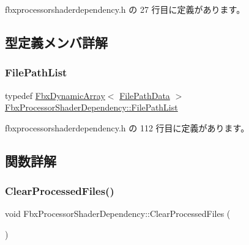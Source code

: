  fbxprocessorshaderdependency.\+h の 27 行目に定義があります。



\subsection{型定義メンバ詳解}
\mbox{\label{class_fbx_processor_shader_dependency_a52e467804857e767f194d73000b08f39}} 
\subsubsection{\texorpdfstring{File\+Path\+List}{FilePathList}}
{\footnotesize\ttfamily typedef \hyperlink{class_fbx_dynamic_array}{Fbx\+Dynamic\+Array}$<$ \hyperlink{struct_fbx_processor_shader_dependency_1_1_file_path_data}{File\+Path\+Data} $>$ \hyperlink{class_fbx_processor_shader_dependency_a52e467804857e767f194d73000b08f39}{Fbx\+Processor\+Shader\+Dependency\+::\+File\+Path\+List}\hspace{0.3cm}{\ttfamily [protected]}}



 fbxprocessorshaderdependency.\+h の 112 行目に定義があります。



\subsection{関数詳解}
\mbox{\label{class_fbx_processor_shader_dependency_a3c93c344271aa09caf870e35597a7b6a}} 
\subsubsection{\texorpdfstring{Clear\+Processed\+Files()}{ClearProcessedFiles()}}
{\footnotesize\ttfamily void Fbx\+Processor\+Shader\+Dependency\+::\+Clear\+Processed\+Files (\begin{DoxyParamCaption}{ }\end{DoxyParamCaption})}

